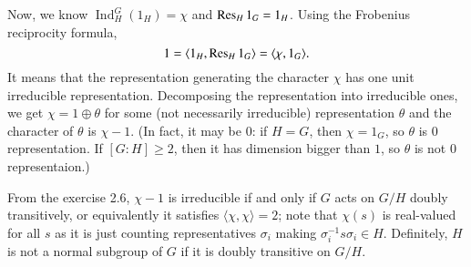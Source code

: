 \documentclass[a4paper, 12pt]{article}
\theoremstyle{Mydefinition}
\theoremstyle{Mytheorem}
\DeclareMathOperator{\Ind}{Ind}
\begin{document}
Now, we know $\Ind_H^G(1_H) = \chi$ and $\Res_H 1_G = 1_H$. Using the Frobenius reciprocity formula,
\begin{equation}
    1 = \langle 1_H, \Res_H 1_G\rangle = \langle \chi, 1_G\rangle.
\end{equation}
It means that the representation generating the character $\chi$ has one unit irreducible representation. Decomposing the representation into irreducible ones, we get $\chi = 1\oplus \theta$ for some (not necessarily irreducible) representation $\theta$ and the character of $\theta$ is $\chi-1$. (In fact, it may be 0: if $H=G$, then $\chi = 1_G$, so $\theta$ is $0$ representation. If $[G:H]\geq 2$, then it has dimension bigger than $1$, so $\theta$ is not $0$ representaion.)

From the exercise 2.6, $\chi-1$ is irreducible if and only if $G$ acts on $G/H$ doubly transitively, or equivalently it satisfies $\langle \chi, \chi\rangle = 2$; note that $\chi(s)$ is real-valued for all $s$ as it is just counting representatives $\sigma_i$ making $\sigma_i^{-1}s\sigma_i\in H$. Definitely, $H$ is not a normal subgroup of $G$ if it is doubly transitive on $G/H$.\\
\end{document}
